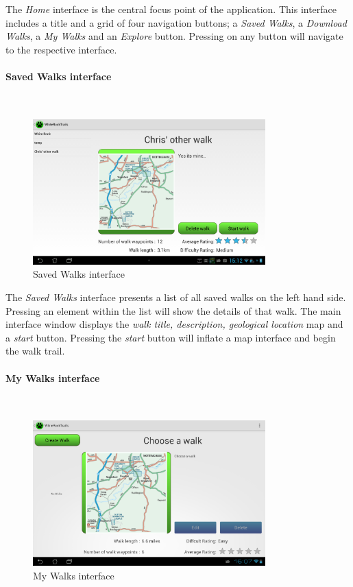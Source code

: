 \documentclass[11pt,a4paper]{report}
\begin{document}
The \emph{Home} interface is the central focus point of the application. This interface includes a title and a grid of four navigation buttons; a \emph{Saved Walks}, a \emph{Download Walks}, a \emph{My Walks} and an \emph{Explore} button. Pressing on any button will navigate to the respective interface.

\paragraph*{Saved Walks interface}\mbox{}\\
\begin{figure}[H]
    \centering
    \includegraphics[width=0.8\textwidth]{chris/saved_walks}
    \caption{Saved Walks interface}
    \label{fig:saved_walks}
\end{figure}

The \emph{Saved Walks} interface presents a list of all saved walks on the left hand side. Pressing an element within the list will show the details of that walk. The main interface window displays the \emph{walk title, description, geological location} map and a \emph{start} button. Pressing the \emph{start} button will inflate a map interface and begin the walk trail.

\paragraph*{My Walks interface}\mbox{}\\

\begin{figure}[H]
    \centering
    \includegraphics[width=0.8\textwidth]{chris/my_walks}
    \caption{My Walks interface}
    \label{fig:my_walks}
\end{figure}
\end{document}
